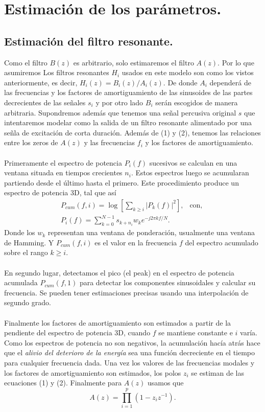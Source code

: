 \documentclass[11pt]{amsart}
\theoremstyle{plain}
\theoremstyle{definition}
\begin{document}
\section{Estimación de los parámetros.}
\subsection{Estimación del filtro resonante.}
Como el filtro $B(z)$ es arbitrario, solo estimaremos el filtro $A(z)$. Por lo que asumiremos 
Los filtros resonantes $H_i$ usados en este modelo son como los vistos anteriormente, es decir, $H_i(z)=B_i(z)/A_i(z)$. De donde $A_i$ dependerá de las frecuencias y los factores de amortiguamiento de las sinusoides de las partes decrecientes de las señales $s_i$ y por otro lado $B_i$ serán escogidos de manera arbitraria. Supondremos además que tenemos una señal percusiva original $s$ que intentaremos modelar como la salida de un filtro resonante alimentado por una señla de excitación de corta duración. Además de (1) y (2), tenemos las relaciones entre los zeros de $A(z)$ y las frecuencias $f_i$ y los factores de amortiguamiento.\\ \\
 Primeramente el espectro de potencia $P_i(f)$ sucesivos se calculan en una ventana situada en tiempos crecientes $n_i$. Estos espectros luego se acumularan partiendo desde el último hasta el primero. Este procedimiento produce un espectro de potencia 3D, tal que así
\begin{eqnarray}
P_{cum}(f,i)=\log\left[\sum_{k \geq i} |P_k(f)|^2\right], \ \ \text{ con, } \\
P_i(f)=\sum_{k=0}^{N-1}s_{k+n_i}w_k e^{-j2\pi k f /N}.
\end{eqnarray}
Donde los $w_k$ representan una ventana de ponderación, usualmente una ventana de Hamming. Y $P_{cum}(f,i)$ es el valor en la frecuencia $f$ del espectro acumulado sobre el rango $k\geq i$. \\ \\
En segundo lugar, detectamos el pico (el peak) en el espectro de potencia acumulada $P_{cum}(f,1)$ para detectar los componentes sinusoidales y calcular su frecuencia. Se pueden tener estimaciones precisas usando una interpolación de segundo grado. \\ \\
Finalmente los factores de amortiguamiento son estimados a partir de la pendiente del espectro de potencia 3D, cuando $f$ se mantiene constante e $i$ varía. Como los espectros de potencia no son negativos, la acumulación hacía atrás hace que el \textit{alivio del deterioro de la energía} sea una función decreciente en el tiempo para cualquier frecuencia dada. Una vez los valores de las frecuencias modales y los factores de amortiguamiento son estimados, los polos $z_i$ se estiman de las ecuaciones (1) y (2). Finalmente para $A(z)$ usamos que
$$
A(z)=\prod_{i=1}^{p}(1-z_iz^{-1}).
$$
\end{document}
